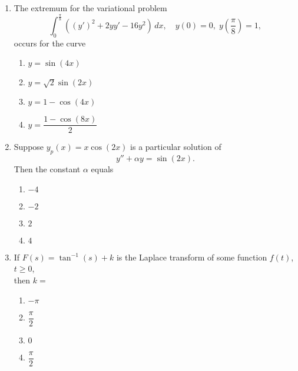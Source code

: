 \documentclass[journal]{IEEEtran}
\numberwithin{equation}{enumi}
\numberwithin{figure}{enumi}
\begin{document}
\begin{enumerate}
Then the Lebesgue measure of the set $\left(\bigcap_{n=1}^{\infty} E_n\right) \cup F$ equals
\hfill{}

\begin{multicols}{4}
\begin{enumerate}
    \item $\tfrac{5}{3}$
    \item $2$
    \item $\tfrac{7}{3}$
    \item $\tfrac{8}{3}$
\end{enumerate}
\end{multicols}



\item The extremum for the variational problem
\[
\int_0^{\frac{\pi}{8}} ((y')^2 + 2yy' - 16y^2) \, dx, \quad y(0) = 0, \; y\left(\frac{\pi}{8}\right) = 1,
\]
occurs for the curve
\hfill{}

\begin{enumerate}
 \item  $y = \sin(4x)$
 \item  $y = \sqrt{2} \sin(2x)$
 \item $y = 1 - \cos(4x)$ 
 \item $y = \dfrac{1 - \cos(8x)}{2}$
\end{enumerate}


\item Suppose $y_p(x) = x \cos(2x)$ is a particular solution of 
\[
y'' + \alpha y = \sin(2x).
\]
Then the constant $\alpha$ equals \hfill{}
\begin{multicols}{4}
\begin{enumerate}
    \item $-4$
    \item $-2$
    \item $2$
    \item $4$
\end{enumerate}
\end{multicols}


\item If $F(s) = \tan^{-1}(s) + k$ is the Laplace transform of some function  $f(t)$, $t \ge 0$, \\then $k =$   \hfill{}
\begin{multicols}{4}
\begin{enumerate}
    \item $-\pi$
    \item $\dfrac{\pi}{2}$
    \item $0$
    \item $\dfrac{\pi}{2}$ 
\end{enumerate}
\end{multicols}
 


\end{enumerate}
\end{document}
